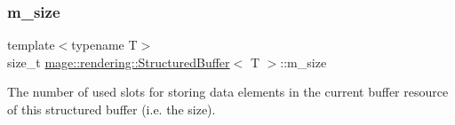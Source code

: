 \subsubsection{\texorpdfstring{m\+\_\+size}{m\_size}}
{\footnotesize\ttfamily template$<$typename T$>$ \\
size\+\_\+t \mbox{\hyperlink{classmage_1_1rendering_1_1_structured_buffer}{mage\+::rendering\+::\+Structured\+Buffer}}$<$ T $>$\+::m\+\_\+size\hspace{0.3cm}{\ttfamily [private]}}

The number of used slots for storing data elements in the current buffer resource of this structured buffer (i.\+e. the size). 